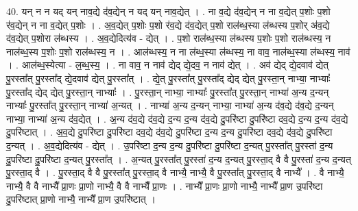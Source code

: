 \documentclass[17pt]{extarticle}
\begin{document}
40. यन् न न यद् यन् नाव॒द्ये द॑व॒द्येन् न यद् यन् नाव॒द्येत् । . ना व॒द्ये द॑व॒द्येन् न ना व॒द्येत् प॒शोः प॒शो र॑व॒द्येन् न ना व॒द्येत् प॒शोः । . अ॒व॒द्येत् प॒शोः प॒शो र॑व॒द्ये द॑व॒द्येत् प॒शो राल॑ब्ध॒स्या ल॑ब्धस्य प॒शोर् अ॑व॒द्ये द॑व॒द्येत् प॒शोरा ल॑ब्धस्य । . अ॒व॒द्येदित्य॑व - द्येत् । . प॒शो राल॑ब्ध॒स्या ल॑ब्धस्य प॒शोः प॒शो राल॑ब्धस्य॒ न नाल॑ब्ध॒स्य प॒शोः प॒शो राल॑ब्धस्य॒ न । . आल॑ब्धस्य॒ न ना ल॑ब्ध॒स्या ल॑ब्धस्य॒ ना वाव॒ नाल॑ब्ध॒स्या ल॑ब्धस्य॒ नाव॑ । . आल॑ब्ध॒स्येत्या - ल॒ब्ध॒स्य॒ । . ना वाव॒ न नाव॑ द्येद् द्ये॒दव॒ न नाव॑ द्येत् । . अव॑ द्येद् द्ये॒दवाव॑ द्येत् पु॒रस्ता᳚त् पु॒रस्ता᳚द् द्ये॒दवाव॑ द्येत् पु॒रस्ता᳚त् । . द्ये॒त् पु॒रस्ता᳚त् पु॒रस्ता᳚द् द्येद् द्येत् पु॒रस्ता॒न् नाभ्या॒ नाभ्याः᳚ पु॒रस्ता᳚द् द्येद् द्येत् पु॒रस्ता॒न् नाभ्याः᳚ । . पु॒रस्ता॒न् नाभ्या॒ नाभ्याः᳚ पु॒रस्ता᳚त् पु॒रस्ता॒न् नाभ्या॑ अ॒न्य द॒न्यन् नाभ्याः᳚ पु॒रस्ता᳚त् पु॒रस्ता॒न् नाभ्या॑ अ॒न्यत् । . नाभ्या॑ अ॒न्य द॒न्यन् नाभ्या॒ नाभ्या॑ अ॒न्य द॑व॒द्ये द॑व॒द्ये द॒न्यन् नाभ्या॒ नाभ्या॑ अ॒न्य द॑व॒द्येत् । . अ॒न्य द॑व॒द्ये द॑व॒द्ये द॒न्य द॒न्य द॑व॒द्ये दु॒परि॑ष्टा दु॒परि॑ष्टा दव॒द्ये द॒न्य द॒न्य द॑व॒द्ये दु॒परि॑ष्टात् । . अ॒व॒द्ये दु॒परि॑ष्टा दु॒परि॑ष्टा दव॒द्ये द॑व॒द्ये दु॒परि॑ष्टा द॒न्य द॒न्य दु॒परि॑ष्टा दव॒द्ये द॑व॒द्ये दु॒परि॑ष्टा द॒न्यत् । . अ॒व॒द्येदित्य॑व - द्येत् । . उ॒परि॑ष्टा द॒न्य द॒न्य दु॒परि॑ष्टा दु॒परि॑ष्टा द॒न्यत् पु॒रस्ता᳚त् पु॒रस्ता॑ द॒न्य दु॒परि॑ष्टा दु॒परि॑ष्टा द॒न्यत् पु॒रस्ता᳚त् । . अ॒न्यत् पु॒रस्ता᳚त् पु॒रस्ता॑ द॒न्य द॒न्यत् पु॒रस्ता॒द् वै वै पु॒रस्ता॑ द॒न्य द॒न्यत् पु॒रस्ता॒द् वै । . पु॒रस्ता॒द् वै वै पु॒रस्ता᳚त् पु॒रस्ता॒द् वै नाभ्यै॒ नाभ्यै॒ वै पु॒रस्ता᳚त् पु॒रस्ता॒द् वै नाभ्यै᳚ । . वै नाभ्यै॒ नाभ्यै॒ वै वै नाभ्यै᳚ प्रा॒णः प्रा॒णो नाभ्यै॒ वै वै नाभ्यै᳚ प्रा॒णः । . नाभ्यै᳚ प्रा॒णः प्रा॒णो नाभ्यै॒ नाभ्यै᳚ प्रा॒ण उ॒परि॑ष्टा दु॒परि॑ष्टात् प्रा॒णो नाभ्यै॒ नाभ्यै᳚ प्रा॒ण उ॒परि॑ष्टात् । \newline
\pagebreak
{}
\end{document}
